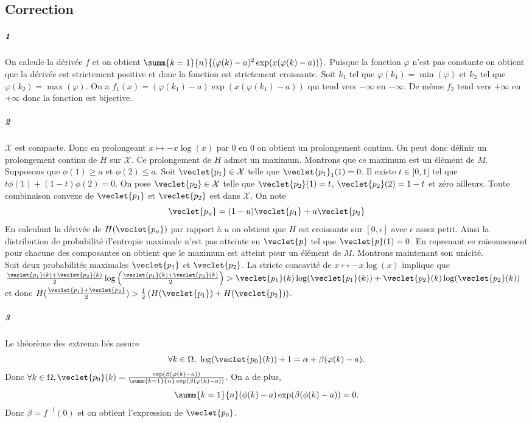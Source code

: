 \documentclass[10pt,a4paper]{article} 
\begin{document}
\subsection{Correction}
\subparagraph{1} On calcule la dérivée $f$ et on obtient $\summ{k=1}{n}{(\varphi(k) - a)^2\exp(x(\varphi(k) -a))}.$ Puisque la fonction $\varphi$ n'est pas constante on obtient que la dérivée est strictement positive et donc la fonction est strictement croissante. Soit $k_1$ tel que $\varphi(k_1) = \min(\varphi)$ et $k_2$ tel que $\varphi(k_2) = \max(\varphi)$. On a $f_1(x) = (\varphi(k_1) - a) \exp(x(\varphi(k_1) - a))$ qui tend vers $-\infty$ en $-\infty$. De même $f_2$ tend vers $+\infty$ en $+\infty$ donc la fonction est bijective.
\subparagraph{2} $\mathcal{X}$ est compacte. Donc en prolongeant $x\mapsto -x\log(x)$ par $0$ en $0$ on obtient un prolongement continu. On peut donc définir un prolongement continu de $H$ sur $\mathcal{X}$. Ce prolongement de $H$ admet un maximum. Montrons que ce maximum est un élément de $M$.\\
Supposons que $\phi(1) \ge a$ et $\phi(2) \le a$. Soit $\veclet{p_1} \in \mathcal{X}$ telle que $\veclet{p_1}_1(1) = 0$. Il existe $t \in ]0,1]$ tel que $t \phi(1) + (1-t) \phi(2) = 0$. On pose $\veclet{p_2} \in \mathcal{X}$ telle que $\veclet{p_2}(1) = t$, $\veclet{p_2}(2) = 1-t$ et zéro ailleurs. Toute combinaison convexe de $\veclet{p_1}$ et $\veclet{p_2}$ est dans $\mathcal{X}$. On note
\[ \veclet{p_u} = (1-u) \veclet{p_1} + u \veclet{p_2}\]
En calculant la dérivée de $H(\veclet{p_u})$ par rapport à $u$ on obtient que $H$ est croissante sur $[0,\epsilon]$ avec $\epsilon$ assez petit. Ainsi la distribution de probabilité d'entropie maximale n'est pas atteinte en $\veclet{p}$ tel que $\veclet{p}(1) = 0$. En reprenant ce raisonnement pour chacune des composantes on obtient que le maximum est atteint pour un élément de $M$. Montrons maintenant son unicité.\\
Soit deux probabilités maximales $\veclet{p_1}$ et $\veclet{p_2}$. La stricte concavité de $x\mapsto -x\log(x)$ implique que $\frac{\veclet{p_1}(k)+\veclet{p_2}(k)}{2}\log \left( \frac{\veclet{p_1}(k)+\veclet{p_2}(k)}{2}\right) > \veclet{p_1}(k)\log(\veclet{p_1}(k)) +\veclet{p_2}(k)\log(\veclet{p_2}(k))$ et donc $H(\frac{\veclet{p_1}+\veclet{p_2}}{2}) >\frac{1}{2} \left( H(\veclet{p_1}) + H(\veclet{p_2}) \right)$.
\subparagraph{3} Le théorème des extrema liés assure
\[\forall k \in \Omega, \ \log(\veclet{p_0}(k)) + 1 = \alpha + \beta (\varphi(k) -a).\]
Donc $\forall k \in \Omega, \veclet{p_0}(k) = \frac{\exp(\beta(\varphi(k)-a))}{\summ{k=1}{n}\exp(\beta(\varphi(k) -a))}$. On a de plus,
\[ \summ{k=1}{n} (\phi(k) -a)\exp(\beta(\phi(k)-a)) = 0 .\]
Donc $\beta = f^{-1}(0)$ et on obtient l'expression de $\veclet{p_0}$.
\end{document}
